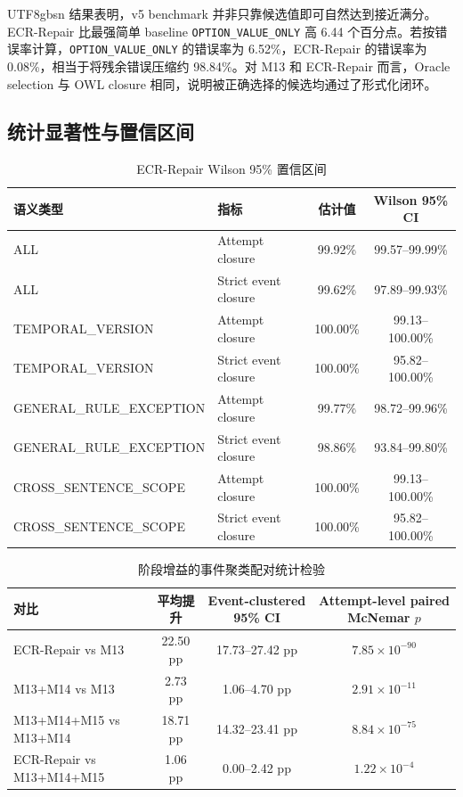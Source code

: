 \documentclass[11pt]{article}
\begin{document}
\begin{CJK*}{UTF8}{gbsn}
结果表明，v5 benchmark 并非只靠候选值即可自然达到接近满分。ECR-Repair 比最强简单 baseline \texttt{OPTION\_VALUE\_ONLY} 高 6.44 个百分点。若按错误率计算，\texttt{OPTION\_VALUE\_ONLY} 的错误率为 6.52\%，ECR-Repair 的错误率为 0.08\%，相当于将残余错误压缩约 98.84\%。对 M13 和 ECR-Repair 而言，Oracle selection 与 OWL closure 相同，说明被正确选择的候选均通过了形式化闭环。

\subsection{统计显著性与置信区间}

\begin{table}[t]
\centering
\caption{ECR-Repair Wilson 95\% 置信区间}
\label{tab:ci}
\begin{tabular}{llcc}
\toprule
语义类型 & 指标 & 估计值 & Wilson 95\% CI \\
\midrule
ALL & Attempt closure & 99.92\% & 99.57--99.99\% \\
ALL & Strict event closure & 99.62\% & 97.89--99.93\% \\
TEMPORAL\_VERSION & Attempt closure & 100.00\% & 99.13--100.00\% \\
TEMPORAL\_VERSION & Strict event closure & 100.00\% & 95.82--100.00\% \\
GENERAL\_RULE\_EXCEPTION & Attempt closure & 99.77\% & 98.72--99.96\% \\
GENERAL\_RULE\_EXCEPTION & Strict event closure & 98.86\% & 93.84--99.80\% \\
CROSS\_SENTENCE\_SCOPE & Attempt closure & 100.00\% & 99.13--100.00\% \\
CROSS\_SENTENCE\_SCOPE & Strict event closure & 100.00\% & 95.82--100.00\% \\
\bottomrule
\end{tabular}
\end{table}

\begin{table}[t]
\centering
\caption{阶段增益的事件聚类配对统计检验}
\label{tab:tests}
\begin{tabular}{lccc}
\toprule
对比 & 平均提升 & Event-clustered 95\% CI & Attempt-level paired McNemar $p$ \\
\midrule
ECR-Repair vs M13 & 22.50 pp & 17.73--27.42 pp & $7.85\times10^{-90}$ \\
M13+M14 vs M13 & 2.73 pp & 1.06--4.70 pp & $2.91\times10^{-11}$ \\
M13+M14+M15 vs M13+M14 & 18.71 pp & 14.32--23.41 pp & $8.84\times10^{-75}$ \\
ECR-Repair vs M13+M14+M15 & 1.06 pp & 0.00--2.42 pp & $1.22\times10^{-4}$ \\
\bottomrule
\end{tabular}
\end{table}


\end{CJK*}
\end{document}
